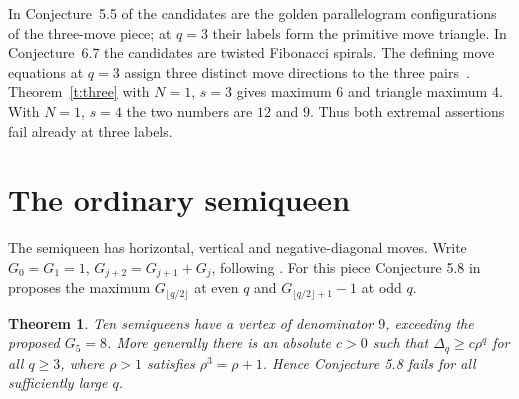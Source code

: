 \documentclass[11pt]{article}
\newtheorem{theorem}{Theorem}
\begin{document}
In Conjecture~5.5 of \cite{chz} the candidates are the golden parallelogram configurations of the three-move piece; at $q=3$ their labels form the primitive move triangle. In Conjecture~6.7 the candidates are twisted Fibonacci spirals. The defining move equations at $q=3$ assign three distinct move directions to the three pairs~\cite[\S6]{chz}. Theorem~\ref{t:three} with $N=1$, $s=3$ gives maximum $6$ and triangle maximum $4$. With $N=1$, $s=4$ the two numbers are $12$ and $9$. Thus both extremal assertions fail already at three labels.

\section{The ordinary semiqueen}
The semiqueen has horizontal, vertical and negative-diagonal moves. Write $G_0=G_1=1$, $G_{j+2}=G_{j+1}+G_j$, following \cite[\S5.2]{chz}. For this piece Conjecture 5.8 in \cite{chz} proposes the maximum $G_{\lfloor q/2\rfloor}$ at even $q$ and $G_{\lfloor q/2\rfloor+1}-1$ at odd $q$.
\begin{theorem}\label{t:semi}
Ten semiqueens have a vertex of denominator $9$, exceeding the proposed $G_5=8$. More generally there is an absolute $c>0$ such that $\Delta_q\ge c\rho^q$ for all $q\ge3$, where $\rho>1$ satisfies $\rho^3=\rho+1$. Hence Conjecture 5.8 fails for all sufficiently large $q$.
\end{theorem}
\end{document}
